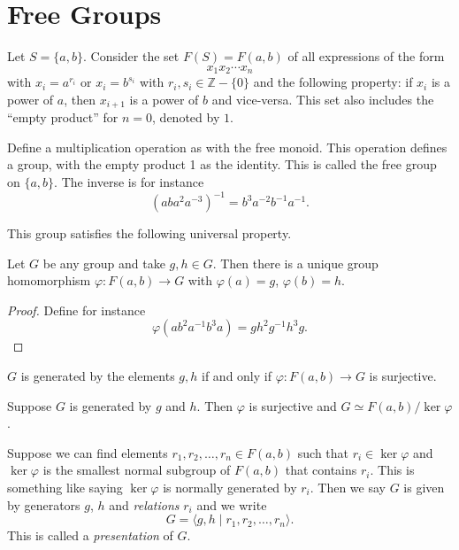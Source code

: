 \section{Free Groups}

\begin{xmpl}
Let $S = \{ a, b \}$. Consider the set $F(S) = F(a, b)$ of all
expressions of the form
$$
x_1 x_2 \cdots x_n
$$
with $x_i = a^{r_i}$ or $x_i = b^{s_i}$ with
$r_i, s_i \in \mathbb{Z} - \{ 0 \}$ and the following property:
if $x_i$ is a power of $a$, then $x_{i+1}$ is a power of $b$ and
vice-versa. This set also includes the ``empty product'' for $n = 0$,
denoted by $1$.

Define a multiplication operation as with the free monoid. This
operation defines a group, with the empty product 1 as the
identity. This is called the free group on $\{a, b\}$. The inverse is
for instance
$$
(a b a^2 a^{-3})^{-1} = b^3 a^{-2} b^{-1} a^{-1}.
$$

This group satisfies the following universal property.
\begin{prop}
Let $G$ be any group and take $g, h \in G$. Then there is a unique
group homomorphism $\varphi : F(a, b) \to G$ with $\varphi(a) = g$,
$\varphi(b) = h$.
\end{prop}
\begin{proof}
Define for instance
$$
\varphi\left(a b^2 a^{-1} b^3 a\right) = g h^2 g^{-1} h^3 g.
$$
\end{proof}

$G$ is generated by the elements $g, h$ if and only if
$\varphi : F(a,b) \to G$ is surjective.
\end{xmpl}

\begin{defn}
Suppose $G$ is generated by $g$ and $h$. Then
$\varphi$ is surjective and $G \simeq F(a,b) / \ker \varphi$.

Suppose we can find elements $r_1, r_2, \dots, r_n \in F(a,b)$ such
that $r_i \in \ker \varphi$ and $\ker \varphi$ is the smallest normal
subgroup of $F(a,b)$ that contains $r_i$. This is something like
saying $\ker \varphi$ is normally generated by $r_i$. Then we say $G$
is given by generators $g$, $h$ and \emph{relations} $r_i$ and we
write
$$
G = \langle g, h \mid r_1, r_2, \dots, r_n \rangle.
$$
This is called a \emph{presentation} of $G$.
\end{defn}

